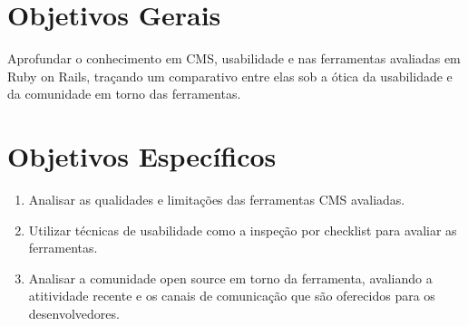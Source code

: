 \section{Objetivos Gerais}

Aprofundar o conhecimento em CMS, usabilidade e nas ferramentas avaliadas em Ruby on Rails, traçando um comparativo entre elas sob a ótica da usabilidade e da comunidade em torno das ferramentas.

\section{Objetivos Específicos}

\begin{enumerate}

\item Analisar as qualidades e limitações das ferramentas CMS avaliadas.
\item Utilizar técnicas de usabilidade como a inspeção por checklist para avaliar as ferramentas.
\item Analisar a comunidade open source em torno da ferramenta, avaliando a atitividade recente e os canais de comunicação que são oferecidos para os desenvolvedores.


\end{enumerate}
